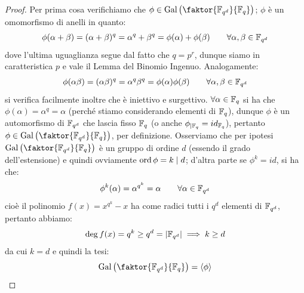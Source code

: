 \documentclass[11pt]{scrartcl}
\begin{document}
\begin{proof}
    Per prima cosa verifichiamo che $\phi \in \Gal\left(\faktor{\F{q^d}}{\F{q}}\right)$; $\phi$ è un omomorfismo di anelli in quanto:
    \[ \phi(\alpha+\beta) = (\alpha+\beta)^q = \alpha^q + \beta^q = \phi(\alpha) + \phi(\beta) \qquad \forall \alpha,\beta \in \mathbb{F}_{q^d} 
        \]
    dove l'ultima uguaglianza segue dal fatto che $q = p^r$, dunque siamo in caratteristica $p$ e vale il Lemma del Binomio Ingenuo. Analogamente:
    \[ \phi(\alpha\beta) = (\alpha\beta)^q = \alpha^q \beta^q = \phi(\alpha)\phi(\beta) \qquad \forall \alpha,\beta \in \mathbb{F}_{q^d} 
        \]
    si verifica facilmente inoltre che è iniettivo e surgettivo. $\forall \alpha \in \mathbb{F}_{q}$ si ha che $\phi(\alpha) = \alpha^q = \alpha$ (perché stiamo considerando
    elementi di $\mathbb{F}_{q}$), dunque $\phi$ è un automorfismo di $\mathbb{F}_{q^d}$ che lascia fisso $\mathbb{F}_{q}$ (o anche $\phi_{|\mathbb{F}_{q}} = id_{\mathbb{F}_{q}}$), pertanto
    $\phi \in \Gal\left(\faktor{\F{q^d}}{\F{q}}\right)$, per definizione. Osserviamo che per ipotesi $\Gal\left(\faktor{\F{q^d}}{\F{q}}\right)$ è un gruppo di ordine
    $d$ (essendo il grado dell'estensione) e quindi ovviamente $\operatorname{ord} \phi = k \mid d$; d'altra parte se $\phi^k = id$, si ha che:
    \[ \phi^k(\alpha) = \alpha^{q^k} = \alpha \qquad \forall \alpha \in \mathbb{F}_{q^d}
        \]
    cioè il polinomio $f(x) = x^{q^k} - x$ ha come radici tutti i $q^d$ elementi di $\mathbb{F}_{q^d}$, pertanto abbiamo:
    \[ \deg f(x) = q^k \geq q^d = |\mathbb{F}_{q^d}|\implies k \geq d
        \]
    da cui $k = d$ e quindi la tesi:
    \[ \Gal\left(\faktor{\F{q^d}}{\F{q}}\right) = \left<\phi\right>
        \]
\end{proof}
\end{document}
